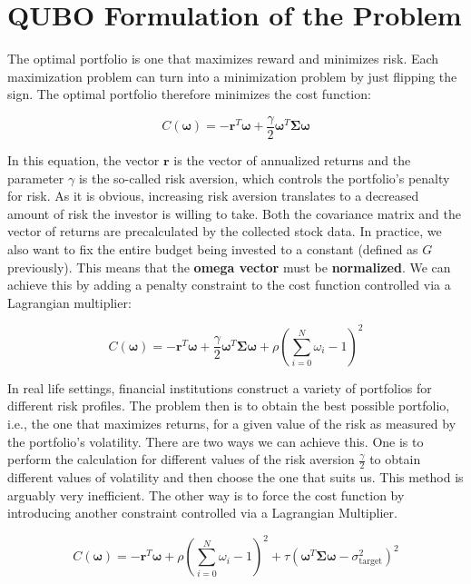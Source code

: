 \documentclass[12pt,a4paper]{report}
\begin{document}
\newpage

\section{QUBO Formulation of the Problem}

\noindent
The optimal portfolio \cite{main_portfolio} is one that maximizes reward and minimizes risk. Each maximization problem can turn into a minimization problem by just flipping the sign. The optimal portfolio therefore minimizes the cost function:

\[ C(\boldsymbol{\omega}) = -\mathbf{r}^T \boldsymbol{\omega} + \frac{\gamma}{2} \boldsymbol{\omega}^T \mathbf{\Sigma} \boldsymbol{\omega} \]

\noindent
In this equation, the vector \(\mathbf{r}\) is the vector of annualized returns and the parameter \(\gamma\) is the so-called risk aversion, which controls the portfolio's penalty for risk. As it is obvious, increasing risk aversion translates to a decreased amount of risk the investor is willing to take. Both the covariance matrix and the vector of returns are precalculated by the collected stock data. In practice, we also want to fix the entire budget being invested to a constant (defined as \( \textit{G} \) previously). This means that the \textbf{omega vector} must be \textbf{normalized}. We can achieve this by adding a penalty constraint to the cost function controlled via a Lagrangian multiplier:

\[
C(\boldsymbol{\omega}) = -\mathbf{r}^T \boldsymbol{\omega} + \frac{\gamma}{2} \boldsymbol{\omega}^T \mathbf{\Sigma} \boldsymbol{\omega} + \rho \left( \sum_{i=0}^{N} \omega_i - 1 \right)^2
\]

\noindent
In real life settings, financial institutions construct a variety of portfolios for different risk profiles. The problem then is to obtain the best possible portfolio, i.e., the one that maximizes returns, for a given value of the risk as measured by the portfolio’s volatility. There are two ways we can achieve this. One is to perform the calculation for different values of the risk aversion \( \frac{\gamma}{2} \) to obtain different values of volatility and then choose the one that suits us. This method is arguably very inefficient. The other way is to force the cost function by introducing another constraint controlled via a Lagrangian Multiplier.

\[
C(\boldsymbol{\omega}) = -\mathbf{r}^T \boldsymbol{\omega} + \rho \left( \sum_{i=0}^{N} \omega_i - 1 \right)^2 + \tau (\boldsymbol{\omega}^T \mathbf{\Sigma} \boldsymbol{\omega} - \sigma_{\text{target}}^2)^2
\]
\end{document}
